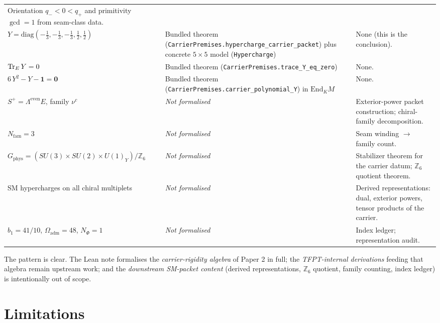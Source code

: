 \documentclass[11pt,a4paper]{article}
\begin{document}
\begin{center}
\begin{tabularx}{\textwidth}{@{}p{}p{}Y@{}}
  Orientation $q_- < 0 < q_+$ and primitivity
  $\gcd = 1$ from seam-class data. \\[3pt]
$Y = \mathrm{diag}(-\tfrac13,-\tfrac13,-\tfrac13,\tfrac12,\tfrac12)$ &
  Bundled theorem
  (\texttt{CarrierPremises.hypercharge\_carrier\_packet}) plus
  concrete $5\times 5$ model (\texttt{Hypercharge}) &
  None (this is the conclusion). \\[3pt]
$\operatorname{Tr}_E Y = 0$ &
  Bundled theorem
  (\texttt{CarrierPremises.trace\_Y\_eq\_zero}) &
  None. \\[3pt]
$6\, Y^2 - Y - \mathbf 1 = \mathbf 0$ &
  Bundled theorem
  (\texttt{CarrierPremises.carrier\_polynomial\_Y}) in
  $\mathrm{End}_K M$ &
  None. \\[3pt]
$S^+ = \Lambda^{\mathrm{even}} E$, family $\nu^c$ &
  \emph{Not formalised} &
  Exterior-power packet construction; chiral-family decomposition. \\[3pt]
$N_{\mathrm{fam}} = 3$ &
  \emph{Not formalised} &
  Seam winding $\to$ family count. \\[3pt]
$G_{\mathrm{phys}} = (SU(3)\times SU(2)\times U(1)_Y)/\mathbb Z_6$ &
  \emph{Not formalised} &
  Stabilizer theorem for the carrier datum; $\mathbb Z_6$
  quotient theorem. \\[3pt]
SM hypercharges on all chiral multiplets &
  \emph{Not formalised} &
  Derived representations: dual, exterior powers,
  tensor products of the carrier. \\[3pt]
$b_1 = 41/10$, $\Omega_{\mathrm{adm}} = 48$, $N_\Phi = 1$ &
  \emph{Not formalised} &
  Index ledger; representation audit. \\
\bottomrule
\end{tabularx}
\end{center}

\smallskip\noindent
The pattern is clear. The Lean note formalises the
\emph{carrier-rigidity algebra} of Paper 2 in full; the
\emph{TFPT-internal derivations} feeding that algebra remain
upstream work; and the \emph{downstream SM-packet content}
(derived representations, $\mathbb Z_6$ quotient, family
counting, index ledger) is intentionally out of scope.

\section{Limitations}
\label{sec:limits}
\end{document}
